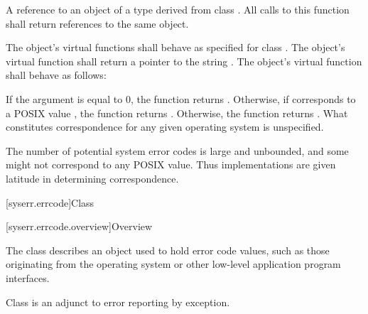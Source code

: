 \begin{itemdescr}
\pnum
\returns
A reference to an object of a type derived from class .
All calls to this function shall return references to the same object.

\pnum
\remarks
The object's  virtual functions shall behave as specified for
class . The object's  virtual function shall return a
pointer to the string . The object's 
virtual function shall behave as follows:

If the argument  is equal to 0,
the function returns .
Otherwise,
if  corresponds to a POSIX  value ,
the function returns .
Otherwise, the function returns .
What constitutes correspondence for any given operating system is unspecified.
\begin{note}
The number of potential system error codes is large
and unbounded, and some might not correspond to any POSIX  value. Thus
implementations are given latitude in determining correspondence.
\end{note}
\end{itemdescr}

[syserr.errcode]{Class }

[syserr.errcode.overview]{Overview}

\pnum
The class  describes an object used to hold error code
values, such as those originating from the operating system or other low-level
application program interfaces.
\begin{note}
Class  is an
adjunct to error reporting by exception.
\end{note}

